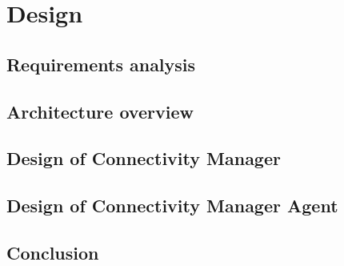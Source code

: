 \chapter{Design}

\section{Requirements analysis}

\section{Architecture overview}

\section{Design of Connectivity Manager}

\section{Design of Connectivity Manager Agent}

\section{Conclusion}